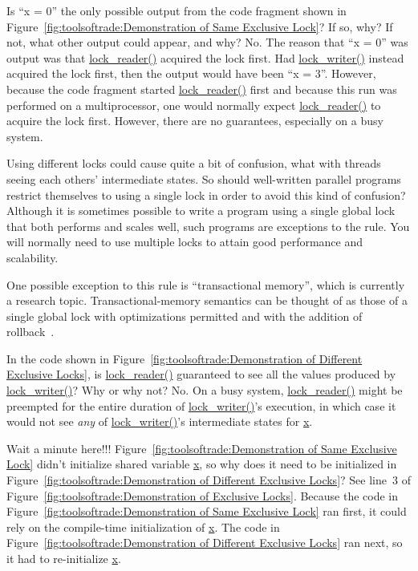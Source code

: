 \QuickQ{}
	Is ``x = 0'' the only possible output from the code fragment
	shown in
	Figure~\ref{fig:toolsoftrade:Demonstration of Same Exclusive Lock}?
	If so, why?
	If not, what other output could appear, and why?
\QuickA{}
	No.
	The reason that ``x = 0'' was output was that \url{lock_reader()}
	acquired the lock first.
	Had \url{lock_writer()} instead acquired the lock first, then
	the output would have been ``x = 3''.
	However, because the code fragment started \url{lock_reader()} first
	and because this run was performed on a multiprocessor,
	one would normally expect \url{lock_reader()} to acquire the
	lock first.
	However, there are no guarantees, especially on a busy system.

\QuickQ{}
	Using different locks could cause quite a bit of confusion,
	what with threads seeing each others' intermediate states.
	So should well-written parallel programs restrict themselves
	to using a single lock in order to avoid this kind of confusion?
\QuickA{}
	Although it is sometimes possible to write a program using a
	single global lock that both performs and scales well, such
	programs are exceptions to the rule.
	You will normally need to use multiple locks to attain good
	performance and scalability.

	One possible exception to this rule is ``transactional memory'',
	which is currently a research topic.
	Transactional-memory semantics can be thought of as those
	of a single global lock with optimizations permitted and
	with the addition of rollback~\cite{HansJBoehm2009HOTPAR}.

\QuickQ{}
	In the code shown in
	Figure~\ref{fig:toolsoftrade:Demonstration of Different Exclusive Locks},
	is \url{lock_reader()} guaranteed to see all the values produced
	by \url{lock_writer()}?
	Why or why not?
\QuickA{}
	No.
	On a busy system, \url{lock_reader()} might be preempted
	for the entire duration of \url{lock_writer()}'s execution,
	in which case it would not see \emph{any} of \url{lock_writer()}'s
	intermediate states for \url{x}.

\QuickQ{}
	Wait a minute here!!!
	Figure~\ref{fig:toolsoftrade:Demonstration of Same Exclusive Lock}
	didn't initialize shared variable \url{x},
	so why does it need to be initialized in
	Figure~\ref{fig:toolsoftrade:Demonstration of Different Exclusive Locks}?
\QuickA{}
	See line~3 of
	Figure~\ref{fig:toolsoftrade:Demonstration of Exclusive Locks}.
	Because the code in
	Figure~\ref{fig:toolsoftrade:Demonstration of Same Exclusive Lock}
	ran first, it could rely on the compile-time initialization of
	\url{x}.
	The code in
	Figure~\ref{fig:toolsoftrade:Demonstration of Different Exclusive Locks}
	ran next, so it had to re-initialize \url{x}.

